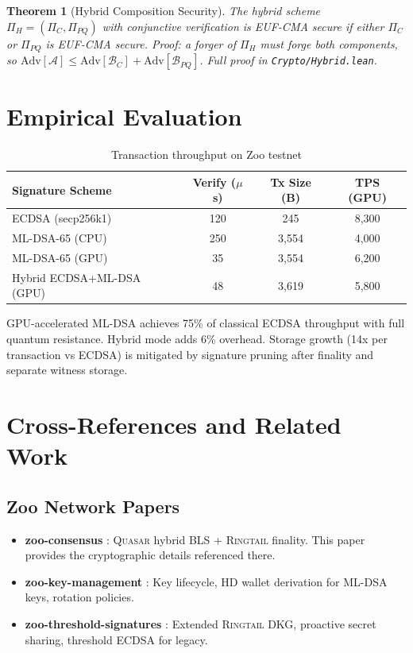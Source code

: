 \documentclass[11pt,letterpaper]{article}
\newtheorem{theorem}{Theorem}
\theoremstyle{definition}
\theoremstyle{remark}
\newcommand{\Ringtail}{\textsc{Ringtail}}
\newcommand{\MLDSA}{\textsc{ML-DSA}}
\begin{document}
\begin{theorem}[Hybrid Composition Security]
The hybrid scheme $\Pi_H = (\Pi_C, \Pi_{PQ})$ with conjunctive verification is EUF-CMA secure if either $\Pi_C$ or $\Pi_{PQ}$ is EUF-CMA secure. Proof: a forger of $\Pi_H$ must forge both components, so $\text{Adv}[\mathcal{A}] \leq \text{Adv}[\mathcal{B}_C] + \text{Adv}[\mathcal{B}_{PQ}]$. Full proof in \texttt{Crypto/Hybrid.lean}.
\end{theorem}

\section{Empirical Evaluation}

\begin{table}[h]
\centering
\begin{tabular}{lccc}
\toprule
\textbf{Signature Scheme} & \textbf{Verify ($\mu$s)} & \textbf{Tx Size (B)} & \textbf{TPS (GPU)} \\
\midrule
ECDSA (secp256k1) & 120 & 245 & 8,300 \\
\MLDSA{}-65 (CPU) & 250 & 3,554 & 4,000 \\
\MLDSA{}-65 (GPU) & 35 & 3,554 & 6,200 \\
Hybrid ECDSA+\MLDSA{} (GPU) & 48 & 3,619 & 5,800 \\
\bottomrule
\end{tabular}
\caption{Transaction throughput on Zoo testnet}
\label{tab:tx-throughput}
\end{table}

GPU-accelerated \MLDSA{} achieves 75\% of classical ECDSA throughput with full quantum resistance. Hybrid mode adds 6\% overhead. Storage growth (14x per transaction vs ECDSA) is mitigated by signature pruning after finality and separate witness storage.

\section{Cross-References and Related Work}

\subsection{Zoo Network Papers}

\begin{itemize}
\item \textbf{zoo-consensus} \cite{zoo-consensus}: \textsc{Quasar} hybrid BLS + \Ringtail{} finality. This paper provides the cryptographic details referenced there.
\item \textbf{zoo-key-management} \cite{zoo-key-mgmt}: Key lifecycle, HD wallet derivation for \MLDSA{} keys, rotation policies.
\item \textbf{zoo-threshold-signatures} \cite{zoo-threshold-sigs}: Extended \Ringtail{} DKG, proactive secret sharing, threshold ECDSA for legacy.
\end{itemize}
\end{document}
